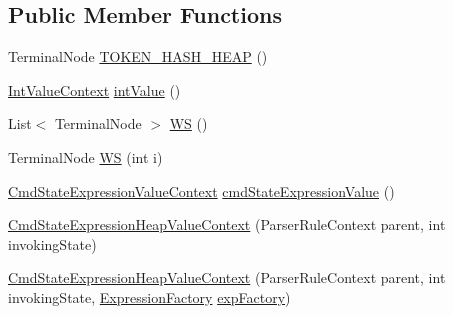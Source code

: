 \subsection*{Public Member Functions}
\begin{DoxyCompactItemize}
\item 
Terminal\+Node \hyperlink{classgov_1_1nasa_1_1jpf_1_1inspector_1_1server_1_1expression_1_1parser_1_1_expression_grammar_pa975e8909fcf76b653e93728b8bf729a1_a43ac8da5b8eea04a054490a8dc2b9019}{T\+O\+K\+E\+N\+\_\+\+H\+A\+S\+H\+\_\+\+H\+E\+AP} ()
\item 
\hyperlink{classgov_1_1nasa_1_1jpf_1_1inspector_1_1server_1_1expression_1_1parser_1_1_expression_grammar_parser_1_1_int_value_context}{Int\+Value\+Context} \hyperlink{classgov_1_1nasa_1_1jpf_1_1inspector_1_1server_1_1expression_1_1parser_1_1_expression_grammar_pa975e8909fcf76b653e93728b8bf729a1_aa60faf1c80b56ef47146c3a04f391d87}{int\+Value} ()
\item 
List$<$ Terminal\+Node $>$ \hyperlink{classgov_1_1nasa_1_1jpf_1_1inspector_1_1server_1_1expression_1_1parser_1_1_expression_grammar_pa975e8909fcf76b653e93728b8bf729a1_adb8b141b0bb38986864b1476629006fa}{WS} ()
\item 
Terminal\+Node \hyperlink{classgov_1_1nasa_1_1jpf_1_1inspector_1_1server_1_1expression_1_1parser_1_1_expression_grammar_pa975e8909fcf76b653e93728b8bf729a1_aaae65b68c626ca273f538df720014580}{WS} (int i)
\item 
\hyperlink{classgov_1_1nasa_1_1jpf_1_1inspector_1_1server_1_1expression_1_1parser_1_1_expression_grammar_pa17ff9e538e96e94398ba5af02b5ffa30}{Cmd\+State\+Expression\+Value\+Context} \hyperlink{classgov_1_1nasa_1_1jpf_1_1inspector_1_1server_1_1expression_1_1parser_1_1_expression_grammar_pa975e8909fcf76b653e93728b8bf729a1_a6c16bf2bc8d619626fde1d4a27f14282}{cmd\+State\+Expression\+Value} ()
\item 
\hyperlink{classgov_1_1nasa_1_1jpf_1_1inspector_1_1server_1_1expression_1_1parser_1_1_expression_grammar_pa975e8909fcf76b653e93728b8bf729a1_a175ce9b4adb02f7b6be589261e260f34}{Cmd\+State\+Expression\+Heap\+Value\+Context} (Parser\+Rule\+Context parent, int invoking\+State)
\item 
\hyperlink{classgov_1_1nasa_1_1jpf_1_1inspector_1_1server_1_1expression_1_1parser_1_1_expression_grammar_pa975e8909fcf76b653e93728b8bf729a1_a3567ac7432218206fa1269fadbe1d2b4}{Cmd\+State\+Expression\+Heap\+Value\+Context} (Parser\+Rule\+Context parent, int invoking\+State, \hyperlink{classgov_1_1nasa_1_1jpf_1_1inspector_1_1server_1_1expression_1_1_expression_factory}{Expression\+Factory} \hyperlink{classgov_1_1nasa_1_1jpf_1_1inspector_1_1server_1_1expression_1_1parser_1_1_expression_grammar_pa975e8909fcf76b653e93728b8bf729a1_a95cd9a0c57f9db34a17a4500e69b5b37}{exp\+Factory})

\end{DoxyCompactItemize}
